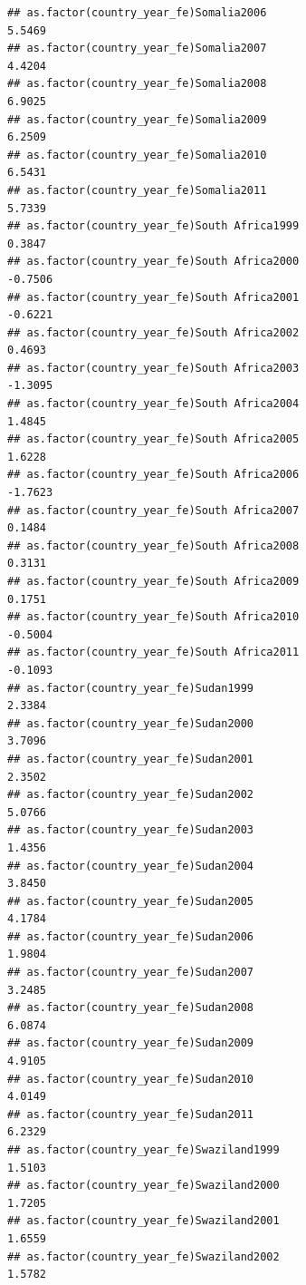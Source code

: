 \documentclass[
  a4paper,
]{article}
\begin{document}
\begin{verbatim}
## as.factor(country_year_fe)Somalia2006                           5.5469
## as.factor(country_year_fe)Somalia2007                           4.4204
## as.factor(country_year_fe)Somalia2008                           6.9025
## as.factor(country_year_fe)Somalia2009                           6.2509
## as.factor(country_year_fe)Somalia2010                           6.5431
## as.factor(country_year_fe)Somalia2011                           5.7339
## as.factor(country_year_fe)South Africa1999                      0.3847
## as.factor(country_year_fe)South Africa2000                     -0.7506
## as.factor(country_year_fe)South Africa2001                     -0.6221
## as.factor(country_year_fe)South Africa2002                      0.4693
## as.factor(country_year_fe)South Africa2003                     -1.3095
## as.factor(country_year_fe)South Africa2004                      1.4845
## as.factor(country_year_fe)South Africa2005                      1.6228
## as.factor(country_year_fe)South Africa2006                     -1.7623
## as.factor(country_year_fe)South Africa2007                      0.1484
## as.factor(country_year_fe)South Africa2008                      0.3131
## as.factor(country_year_fe)South Africa2009                      0.1751
## as.factor(country_year_fe)South Africa2010                     -0.5004
## as.factor(country_year_fe)South Africa2011                     -0.1093
## as.factor(country_year_fe)Sudan1999                             2.3384
## as.factor(country_year_fe)Sudan2000                             3.7096
## as.factor(country_year_fe)Sudan2001                             2.3502
## as.factor(country_year_fe)Sudan2002                             5.0766
## as.factor(country_year_fe)Sudan2003                             1.4356
## as.factor(country_year_fe)Sudan2004                             3.8450
## as.factor(country_year_fe)Sudan2005                             4.1784
## as.factor(country_year_fe)Sudan2006                             1.9804
## as.factor(country_year_fe)Sudan2007                             3.2485
## as.factor(country_year_fe)Sudan2008                             6.0874
## as.factor(country_year_fe)Sudan2009                             4.9105
## as.factor(country_year_fe)Sudan2010                             4.0149
## as.factor(country_year_fe)Sudan2011                             6.2329
## as.factor(country_year_fe)Swaziland1999                         1.5103
## as.factor(country_year_fe)Swaziland2000                         1.7205
## as.factor(country_year_fe)Swaziland2001                         1.6559
## as.factor(country_year_fe)Swaziland2002                         1.5782

\end{verbatim}
\end{document}
